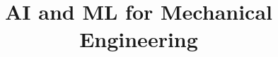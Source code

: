 \documentclass[xcolor=dvipsnames,compress,t,pdf,notes, 9pt]{beamer}
\title[\insertframenumber /\inserttotalframenumber]{AI and ML for Mechanical Engineering}
\begin{document}
	\begin{frame}
	\titlepage
	\end{frame}
	

	
	
	
\end{document}
